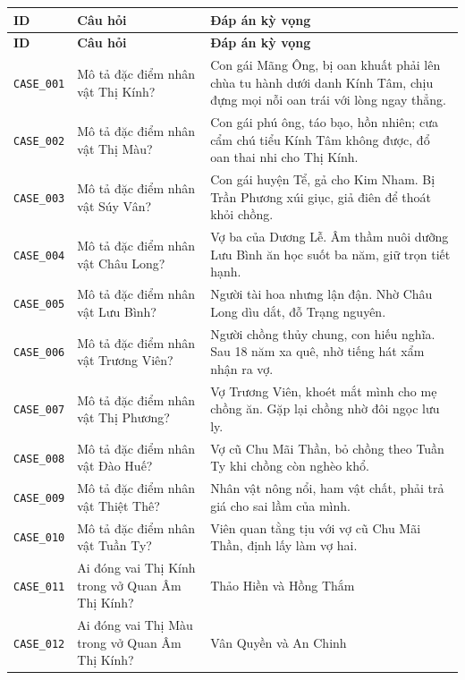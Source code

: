 \begin{longtable}{|p{1.9cm}|p{5.2cm}|p{7.3cm}|}
  \hline
  \textbf{ID} & \textbf{Câu hỏi} & \textbf{Đáp án kỳ vọng} \\
  \hline
  \endfirsthead
  \hline
  \textbf{ID} & \textbf{Câu hỏi} & \textbf{Đáp án kỳ vọng} \\
  \hline
  \endhead
  \hline
  \endfoot
  \hline
  \endlastfoot

  \texttt{CASE\_001} & Mô tả đặc điểm nhân vật Thị Kính? & Con gái Mãng Ông, bị oan khuất phải lên chùa tu hành dưới danh Kính Tâm, chịu đựng mọi nỗi oan trái với lòng ngay thẳng. \\
  \hline
  \texttt{CASE\_002} & Mô tả đặc điểm nhân vật Thị Màu? & Con gái phú ông, táo bạo, hồn nhiên; cưa cẩm chú tiểu Kính Tâm không được, đổ oan thai nhi cho Thị Kính. \\
  \hline
  \texttt{CASE\_003} & Mô tả đặc điểm nhân vật Súy Vân? & Con gái huyện Tể, gả cho Kim Nham. Bị Trần Phương xúi giục, giả điên để thoát khỏi chồng. \\
  \hline
  \texttt{CASE\_004} & Mô tả đặc điểm nhân vật Châu Long? & Vợ ba của Dương Lễ. Âm thầm nuôi dưỡng Lưu Bình ăn học suốt ba năm, giữ trọn tiết hạnh. \\
  \hline
  \texttt{CASE\_005} & Mô tả đặc điểm nhân vật Lưu Bình? & Người tài hoa nhưng lận đận. Nhờ Châu Long dìu dắt, đỗ Trạng nguyên. \\
  \hline
  \texttt{CASE\_006} & Mô tả đặc điểm nhân vật Trương Viên? & Người chồng thủy chung, con hiếu nghĩa. Sau 18 năm xa quê, nhờ tiếng hát xẩm nhận ra vợ. \\
  \hline
  \texttt{CASE\_007} & Mô tả đặc điểm nhân vật Thị Phương? & Vợ Trương Viên, khoét mắt mình cho mẹ chồng ăn. Gặp lại chồng nhờ đôi ngọc lưu ly. \\
  \hline
  \texttt{CASE\_008} & Mô tả đặc điểm nhân vật Đào Huế? & Vợ cũ Chu Mãi Thần, bỏ chồng theo Tuần Ty khi chồng còn nghèo khổ. \\
  \hline
  \texttt{CASE\_009} & Mô tả đặc điểm nhân vật Thiệt Thê? & Nhân vật nông nổi, ham vật chất, phải trả giá cho sai lầm của mình. \\
  \hline
  \texttt{CASE\_010} & Mô tả đặc điểm nhân vật Tuần Ty? & Viên quan tằng tịu với vợ cũ Chu Mãi Thần, định lấy làm vợ hai. \\
  \hline
  \texttt{CASE\_011} & Ai đóng vai Thị Kính trong vở Quan Âm Thị Kính? & Thảo Hiền và Hồng Thắm \\
  \hline
  \texttt{CASE\_012} & Ai đóng vai Thị Màu trong vở Quan Âm Thị Kính? & Vân Quyền và An Chinh \\

\end{longtable}
